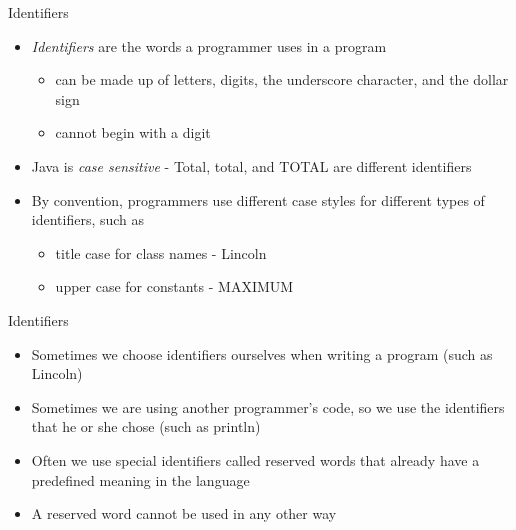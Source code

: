 \documentclass{beamer}
\begin{document}
\begin{frame}{Identifiers}
\begin{itemize}
\item \textit{Identifiers} are the words a programmer uses in a program
\begin{itemize}
\item can be made up of letters, digits, the underscore character, and the dollar sign
\item cannot begin with a digit
\end{itemize}
\item Java is \textit{case sensitive} - Total, total, and TOTAL are different identifiers
\item By convention, programmers use different case styles for different types of identifiers, such as
\begin{itemize}
\item title case for class names - Lincoln
\item upper case for constants - MAXIMUM
\end{itemize}
\end{itemize}
\end{frame}

\begin{frame}{Identifiers}
\begin{itemize}
\item Sometimes we choose identifiers ourselves when writing a program (such as Lincoln)
\item Sometimes we are using another programmer's code, so we use the identifiers that he or she chose (such as println)
\item Often we use special identifiers called reserved words that already have a predefined meaning in the language
\item A reserved word cannot be used in any other way
\end{itemize}
\end{frame}
\end{document}
